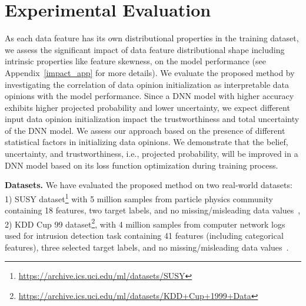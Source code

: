 \section{Experimental Evaluation}
\label{exp}

As each data feature has its own distributional properties in the training dataset, we assess the significant impact of data feature distributional shape including intrinsic properties like feature skewness, on the model performance (see Appendix~\ref{impact_app} for more details). We evaluate the proposed method by investigating the correlation of data opinion initialization as interpretable data opinions with the model performance. Since a DNN model with higher accuracy exhibits higher projected probability and lower uncertainty, we expect different input data opinion initialization impact the trustworthiness and total uncertainty of the DNN model. We assess our approach based on the presence of different statistical factors in initializing data opinions. We demonstrate that the belief, uncertainty, and trustworthiness, i.e., projected probability, will be improved in a DNN model based on its loss function optimization during training process. 



\vspace {.2cm}
\noindent
\textbf{Datasets.}
We have evaluated the proposed method on two real-world datasets: 1) SUSY dataset\footnote{\url{https://archive.ics.uci.edu/ml/datasets/SUSY}} with 5 million samples from particle physics community containing 18 features, two target labels, and no missing/misleading data values~\cite{susy}, 
2) KDD Cup 99 dataset\footnote{\url{https://archive.ics.uci.edu/ml/datasets/KDD+Cup+1999+Data}}, with 4 million samples from computer network logs used for intrusion detection task containing 41 features (including categorical features), three selected target labels, and no missing/misleading data values~\cite{kdd}.

